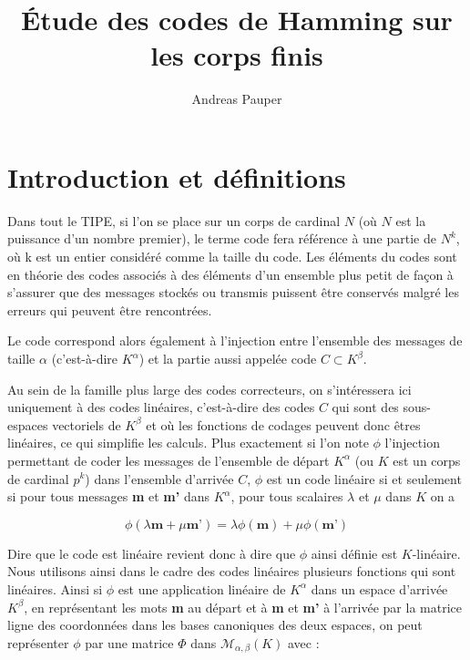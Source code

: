 \documentclass[10pt]{article}
\date{}
\title{\textbf{Étude des codes de Hamming sur les corps finis}}
\author{Andreas Pauper}
\begin{document}
\maketitle

\section{Introduction et définitions}

Dans tout le TIPE, si l'on se place sur un corps de cardinal $N$ (où $N$ est la puissance d'un nombre premier), le terme code fera référence à une partie de $ N^{k} $, où k est un entier considéré comme la taille du code.
Les éléments du codes sont en théorie des codes associés à des éléments d'un ensemble plus petit de façon à s'assurer que des messages stockés ou transmis puissent être conservés malgré les erreurs qui peuvent être rencontrées.

Le code correspond alors également à l'injection entre l'ensemble des messages de taille $\alpha$ (c'est-à-dire $K^{\alpha}$) et la partie aussi appelée code $C \subset K^{\beta}$.

Au sein de la famille plus large des codes correcteurs, on s'intéressera ici uniquement à des codes linéaires, c'est-à-dire des codes $C$ qui sont des sous-espaces vectoriels de $K^{\beta}$ et où les fonctions de codages peuvent donc êtres linéaires, ce qui simplifie les calculs.
Plus exactement si l'on note $\phi$ l'injection permettant de coder les messages de l'ensemble de départ $K^{\alpha}$ (ou $K$ est un corps de cardinal $p^{k}$) dans l'ensemble d'arrivée $C$, $\phi$ est un code linéaire si et seulement si pour tous messages \textbf{m} et \textbf{m'} dans $K^{\alpha}$, pour tous scalaires $\lambda$ et $\mu$ dans $K$ on a

\begin{displaymath}
\phi (\lambda \textbf{m}+ \mu \textbf{m'})=\lambda  \phi(\textbf{m})+\mu  \phi(\textbf{m'})
\end{displaymath}

Dire que le code est linéaire revient donc à dire que $\phi$ ainsi définie est $K$-linéaire. Nous utilisons ainsi dans le cadre des codes linéaires plusieurs fonctions qui sont linéaires.
Ainsi si $\phi$ est une application linéaire de $K^{\alpha}$ dans un espace d'arrivée $K^{\beta}$, en représentant les mots \textbf{m} au départ et à \textbf{m} et \textbf{m'} à l'arrivée par la matrice ligne des coordonnées dans les bases canoniques des deux espaces, on peut représenter $\phi$ par une matrice $\Phi$ dans $\mathcal{M}_{\alpha,\beta}(K)$ avec :
\end{document}
